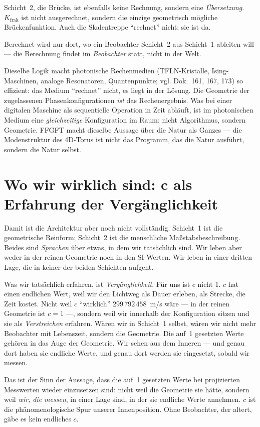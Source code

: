 Schicht~2, die Brücke, ist ebenfalls keine Rechnung, sondern eine
\emph{Übersetzung}. $K_{\mathrm{frak}}$ ist nicht ausgerechnet, sondern
die einzige geometrisch mögliche Brückenfunktion. Auch die Skalentreppe
``rechnet'' nicht; sie ist da.

Berechnet wird nur dort, wo ein Beobachter Schicht~2 aus Schicht~1
ableiten will --- die Berechnung findet im \emph{Beobachter} statt,
nicht in der Welt.

Dieselbe Logik macht photonische Rechenmedien (TFLN-Kristalle,
Ising-Maschinen, analoge Resonatoren, Quantenpunkte; vgl. Dok.~161,
167, 173) so effizient: das Medium ``rechnet'' nicht, es liegt in der
Lösung. Die Geometrie der zugelassenen Phasenkonfigurationen \emph{ist}
das Rechenergebnis. Was bei einer digitalen Maschine als sequentielle
Operation in Zeit abläuft, ist im photonischen Medium eine
\emph{gleichzeitige} Konfiguration im Raum: nicht Algorithmus, sondern
Geometrie. FFGFT macht dieselbe Aussage über die Natur als Ganzes ---
die Modenstruktur des 4D-Torus ist nicht das Programm, das die Natur
ausführt, sondern die Natur selbst.

\section{Wo wir wirklich sind: c als Erfahrung der Vergänglichkeit}

Damit ist die Architektur aber noch nicht vollständig. Schicht~1 ist
die geometrische Reinform; Schicht~2 ist die menschliche
Maßstabsbeschreibung. Beides sind \emph{Sprachen} über etwas, in dem
wir tatsächlich sind. Wir leben aber weder in der reinen Geometrie noch
in den SI-Werten. Wir leben in einer dritten Lage, die in keiner der
beiden Schichten aufgeht.

Was wir tatsächlich erfahren, ist \emph{Vergänglichkeit}. Für uns ist
$c$ nicht 1. $c$ hat einen endlichen Wert, weil wir den Lichtweg als
Dauer erleben, als Strecke, die Zeit kostet. Nicht weil $c$ ``wirklich''
$299\,792\,458$~m/s wäre --- in der reinen Geometrie ist $c = 1$ ---,
sondern weil wir innerhalb der Konfiguration sitzen und sie als
\emph{Verstreichen} erfahren. Wären wir in Schicht~1 selbst, wären wir
nicht mehr Beobachter mit Lebenszeit, sondern die Geometrie. Die
auf~1 gesetzten Werte gehören in das Auge der Geometrie. Wir sehen aus
dem Inneren --- und genau dort haben sie endliche Werte, und genau dort
werden sie eingesetzt, sobald wir messen.

Das ist der Sinn der Aussage, dass die auf~1 gesetzten Werte bei
projizierten Messwerten wieder einzusetzen sind: nicht weil die
Geometrie sie hätte, sondern weil \emph{wir, die messen}, in einer Lage
sind, in der sie endliche Werte annehmen. $c$ ist die phänomenologische
Spur unserer Innenposition. Ohne Beobachter, der altert, gäbe es kein
endliches $c$.

